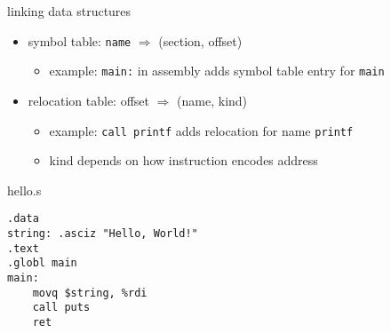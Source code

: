 \begin{frame}{linking data structures}
    \begin{itemize}
    \item symbol table: {\tt name} $\Rightarrow$ (section, offset)
        \begin{itemize}
        \item example: {\tt main:} in assembly adds symbol table entry for {\tt main}
        \end{itemize}
    \item relocation table: offset $\Rightarrow$ (name, kind)
        \begin{itemize}
        \item example: {\tt call printf} adds relocation for name {\tt printf}
        \item kind depends on how instruction encodes address
        \end{itemize}
    \end{itemize}
\end{frame}

\begin{frame}[fragile,label=linkingExAsm]{hello.s}
\begin{lstlisting}
.data
string: .asciz "Hello, World!"
.text
.globl main
main:
    movq $string, %rdi
    call puts
    ret
\end{lstlisting}
\end{frame}


